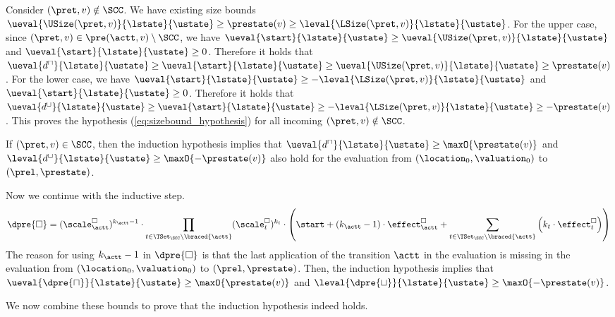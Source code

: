 Consider $(\pret, v) \notin \SCC$.
We have existing size bounds $\ueval{\USize(\pret, v)}{\lstate}{\ustate} \geq \prestate(v) \geq \leval{\LSize(\pret, v)}{\lstate}{\ustate}$.
For the upper case, since $(\pret, v) \in \pre(\actt, v) \setminus \SCC$, we have $\ueval{\start}{\lstate}{\ustate} \geq \ueval{\USize(\pret, v)}{\lstate}{\ustate}$ and $\ueval{\start}{\lstate}{\ustate} \geq 0$.
Therefore it holds that $\ueval{d^\sqcap}{\lstate}{\ustate} \geq \ueval{\start}{\lstate}{\ustate} \geq \ueval{\USize(\pret, v)}{\lstate}{\ustate} \geq \prestate(v)$.
For the lower case, we have $\ueval{\start}{\lstate}{\ustate} \geq -\leval{\LSize(\pret, v)}{\lstate}{\ustate}$ and $\ueval{\start}{\lstate}{\ustate} \geq 0$.
Therefore it holds that $\ueval{d^\sqcup}{\lstate}{\ustate} \geq \ueval{\start}{\lstate}{\ustate} \geq -\leval{\LSize(\pret, v)}{\lstate}{\ustate} \geq -\prestate(v)$.
This proves the hypothesis (\ref{eq:sizebound_hypothesis}) for all incoming $(\pret, v) \notin \SCC$.

If $(\pret, v) \in \SCC$, then the induction hypothesis implies that $\ueval{d^\sqcap}{\lstate}{\ustate} \geq \maxO{\prestate(v)}$ and $\leval{d^\sqcup}{\lstate}{\ustate} \geq \maxO{-\prestate(v)}$ also hold for the evaluation from $(\location_0, \valuation_0)$ to $(\prel, \prestate)$.

Now we continue with the inductive step.
\begin{equation} \label{eq:induction_consequence}
  \dpre{\square} = (\scale^\square_\actt)^{k_\actt - 1} \cdot \prod_{t \in \TSet_\SCC \setminus \braced{\actt}} (\scale^\square_t)^{k_t} \cdot \left( \start + \left( k_\actt - 1 \right) \cdot \effect^\square_\actt + \sum_{t \in \TSet_\SCC \setminus \braced{\actt}} \left( k_t \cdot \effect^\square_t \right) \right)
\end{equation}
The reason for using $k_\actt - 1$ in $\dpre{\square}$ is that the last application of the transition $\actt$ in the evaluation is missing in the evaluation from $(\location_0, \valuation_0)$ to $(\prel, \prestate)$.
Then, the induction hypothesis implies that $\ueval{\dpre{\sqcap}}{\lstate}{\ustate} \geq \maxO{\prestate(v)}$ and $\leval{\dpre{\sqcup}}{\lstate}{\ustate} \geq \maxO{-\prestate(v)}$.

We now combine these bounds to prove that the induction hypothesis indeed holds.

